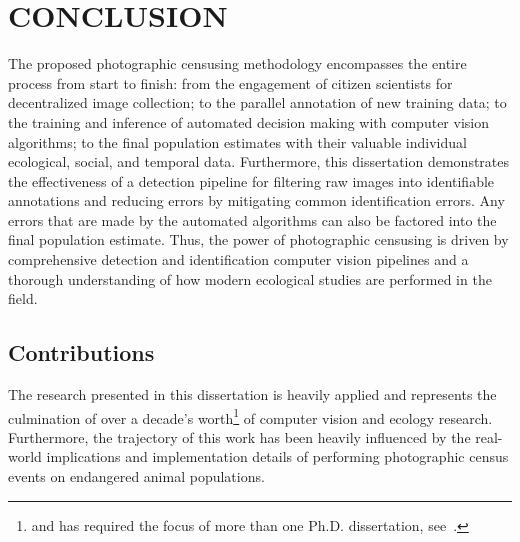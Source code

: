 \chapter{CONCLUSION} \label{chapter:conclusion}

\noindent The proposed photographic censusing methodology encompasses the entire process from start to finish: from the engagement of citizen scientists for decentralized image collection; to the parallel annotation of new training data; to the training and inference of automated decision making with computer vision algorithms; to the final population estimates with their valuable individual ecological, social, and temporal data.  Furthermore, this dissertation demonstrates the effectiveness of a detection pipeline for filtering raw images into identifiable annotations and reducing errors by mitigating common identification errors.  Any errors that are made by the automated algorithms can also be factored into the final population estimate. Thus, the power of photographic censusing is driven by comprehensive detection and identification computer vision pipelines and a thorough understanding of how modern ecological studies are performed in the field.

\section{Contributions}

The research presented in this dissertation is heavily applied and represents the culmination of over a decade's worth\footnote{and has required the focus of more than one Ph.D. dissertation, see~\cite{crall_identifying_2017}.} of computer vision and ecology research.  Furthermore, the trajectory of this work has been heavily influenced by the real-world implications and implementation details of performing photographic census events on endangered animal populations.

